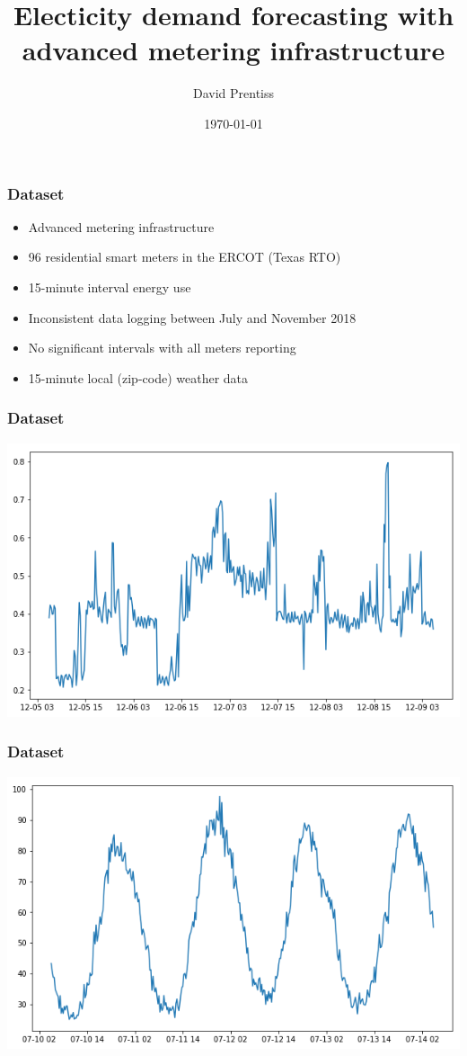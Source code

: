 \documentclass{beamer}
\begin{document}
\title{Electicity demand forecasting with advanced metering infrastructure}
\author{David Prentiss}
\date{\today}

\frame{\titlepage}

\begin{frame}
  \frametitle{Dataset}
  \begin{itemize}
    \item Advanced metering infrastructure
    \item 96 residential smart meters in the ERCOT (Texas RTO)
    \item 15-minute interval energy use
    \item Inconsistent data logging between July and November 2018
    \item No significant intervals with all meters reporting
    \item 15-minute local (zip-code) weather data
  \end{itemize}
\end{frame}

\begin{frame}
  \frametitle{Dataset}
  \includegraphics[width=\textwidth]{ami.png}
\end{frame}

\begin{frame}
  \frametitle{Dataset}
  \includegraphics[width=\textwidth]{sum.png}
\end{frame}
\end{document}
